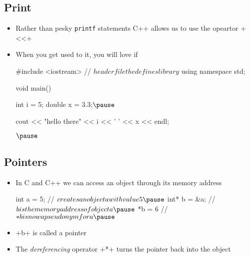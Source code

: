 
\begin{slide}
\section{Print}

\begin{PauseHighLight}
  \begin{itemize}
  \item Rather than pesky \texttt{printf} statements C++ allows us to
    use the opeartor \jl+<<+\pause
  \item When you get used to it, you will love if
    \begin{cpp}
      #include <iostream>      // $header file the defines library$
      using namespace std;

      void main() {
        int i = 5;
        double x = 3.3;$\pause$
        
        cout << "hello there" << i << ' ' << x << endl; 
      }$\pause$
    \end{cpp}
  \end{itemize}
\end{PauseHighLight}

\end{slide}


\Outline

\begin{slide}
\section{Pointers}
  
\begin{PauseHighLight}
  \begin{itemize}
  \item In C and C++ we can access an object through its memory
    address
    \begin{cpp}
      int a = 5;    // $creates an object a with value 5\pause$
      int* b = &a;  // $b is the memory address of object a\pause$
      *b = 6        // $*b is now a pseudonym for a\pause$
    \end{cpp}
  \item \jl+b+ is called a pointer\pause
  \item The \textit{dereferencing} operator \jl+*+ turns the pointer
    back into the object\pause
  \end{itemize}
\end{PauseHighLight}

\end{slide}

